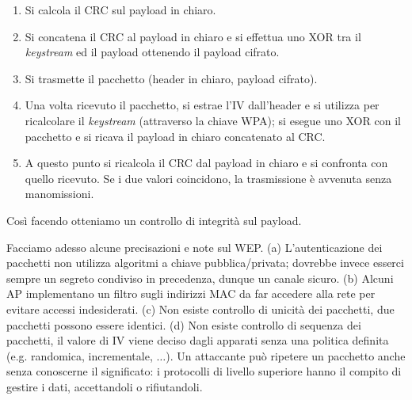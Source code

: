 \begin{enumerate}
	\item Si calcola il CRC sul payload in chiaro.
	\item Si concatena il CRC al payload in chiaro e si effettua uno XOR tra il \textit{keystream} ed il payload ottenendo il payload cifrato.
	\item Si trasmette il pacchetto (header in chiaro, payload cifrato).
	\item Una volta ricevuto il pacchetto, si estrae l'IV dall'header e si utilizza per ricalcolare il \textit{keystream} (attraverso la chiave WPA); si esegue uno XOR con il pacchetto e si ricava il payload in chiaro concatenato al CRC.
	\item A questo punto si ricalcola il CRC dal payload in chiaro e si confronta con quello ricevuto. Se i due valori coincidono, la trasmissione è avvenuta senza manomissioni.
\end{enumerate}
Così facendo otteniamo un controllo di integrità sul payload.

Facciamo adesso alcune precisazioni e note sul WEP. (a) L'autenticazione dei pacchetti non utilizza algoritmi a chiave pubblica/privata; dovrebbe invece esserci sempre un segreto condiviso in precedenza, dunque un canale sicuro. (b) Alcuni AP implementano un filtro sugli indirizzi MAC da far accedere alla rete per evitare accessi indesiderati. (c) Non esiste controllo di unicità dei pacchetti, due pacchetti possono essere identici. (d) Non esiste controllo di sequenza dei pacchetti, il valore di IV viene deciso dagli apparati senza una politica definita (e.g. randomica, incrementale, $\dots$). Un attaccante può ripetere un pacchetto anche senza conoscerne il significato: i protocolli di livello superiore hanno il compito di gestire i dati, accettandoli o rifiutandoli.

